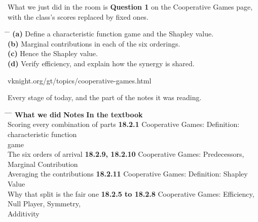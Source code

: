 {\large What we just did in the room is \textbf{Question 1} on the Cooperative
Games page, with the class's scores replaced by fixed ones.}

\vspace{0.9cm}

\hspace{0.6cm}
\begin{minipage}{0.92\linewidth}
{\large
\begin{tabbing}
\hspace{1.2cm} \= \hspace{17cm} \= \kill
\textbf{(a)} \> Define a characteristic function game and the Shapley
  value. \> [4]\\[0.55em]
\textbf{(b)} \> Marginal contributions in each of the six orderings. \> [5]\\[0.55em]
\textbf{(c)} \> Hence the Shapley value. \> [2]\\[0.55em]
\textbf{(d)} \> Verify efficiency, and explain how the synergy is
  shared. \> [4]
\end{tabbing}}
\end{minipage}

\vspace{1.2cm}

\begin{center}
{\large\color{inkgrey} vknight.org/gt/topics/cooperative-games.html}
\end{center}

\newpage
\nonotes
{}

\vspace{0.3cm}

{\large Every stage of today, and the part of the notes it was reading.}

\vspace{0.35cm}

\hspace{0.3cm}
\begin{minipage}{0.95\linewidth}
\begin{tabbing}
\hspace{6.9cm} \= \hspace{3.0cm} \= \hspace{9.4cm} \= \kill
\textbf{What we did} \> {\color{inkteal}\textbf{Notes}} \> \textbf{In the textbook} \>
  \\[0.5em]
Scoring every combination of parts \> {\color{inkteal}\textbf{18.2.1}} \> Cooperative
  Games: Definition: characteristic function \> \\
\> \> game \> \\[0.45em]
The six orders of arrival \> {\color{inkteal}\textbf{18.2.9, 18.2.10}} \> Cooperative
  Games: Predecessors, Marginal Contribution \> \\[0.45em]
Averaging the contributions \> {\color{inkteal}\textbf{18.2.11}} \> Cooperative Games:
  Definition: Shapley Value \> \\[0.45em]
Why that split is the fair one \> {\color{inkteal}\textbf{18.2.5 to 18.2.8}} \>
  Cooperative Games: Efficiency, Null Player, Symmetry, \> \\
\> \> Additivity \> 
\end{tabbing}
\end{minipage}

